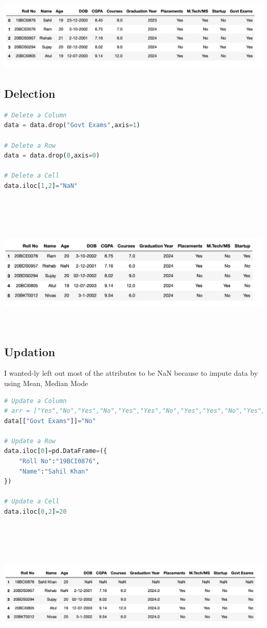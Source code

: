 \documentclass{article}
\begin{document}
\includegraphics[scale=0.65]{images/two.png}
\subsection{Delection}
\begin{lstlisting}[language=Python]
# Delete a Column
data = data.drop("Govt Exams",axis=1)

# Delete a Row
data = data.drop(0,axis=0)

# Delete a Cell
data.iloc[1,2]="NaN"
    
\end{lstlisting}\\\\\\
\includegraphics[scale=0.65]{images/three.png}\\\\\
\subsection{Updation}
I wanted-ly left out most of the attributes to be NaN because to impute data by using Mean, Median Mode
\begin{lstlisting}[language=Python]
# Update a Column
# arr = ["Yes","No","Yes","No","Yes","Yes","No","Yes","Yes","No","Yes","Yes","No","Yes","Yes","No","Yes","Yes","No","Yes","Yes","No","Yes","Yes"]
data[["Govt Exams"]]="No"

# Update a Row
data.iloc[0]=pd.DataFrame=({
    "Roll No":"19BCI0876",
    "Name":"Sahil Khan"
})

# Update a Cell
data.iloc[0,2]=20
    
\end{lstlisting}\\\\\\
\includegraphics[scale=0.65]{images/four.png}
\end{document}
